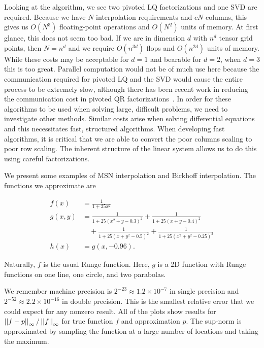 Looking at the algorithm, we see two pivoted LQ factorizations
and one SVD are required.
Because we have $N$ interpolation requirements
and $cN$ columns, this gives us $O(N^{3})$ floating-point operations
and $O(N^{2})$ units of memory.
At first glance, this does not seem too bad.
If we are in dimension $d$ with $n^{d}$ tensor grid points, then $N = n^{d}$ and
we require $O(n^{3d})$ flops and $O(n^{2d})$ units of memory.
While these costs may be acceptable for $d=1$ and bearable for $d=2$,
when $d=3$ this is too great.
Parallel computation would not be
of much use here because the communication required for pivoted LQ
and the SVD would cause the entire process to be extremely slow,
although there has been recent work in reducing the communication cost
in pivoted QR factorizations~\cite{demmel2015communication}.
In order for these algorithms to be used when solving large, difficult
problems, we need to investigate other methods.
Similar costs arise when solving differential equations and
this necessitates fast, structured algorithms.
When developing fast algorithms, it is critical
that we are able to convert the poor columns scaling to poor row scaling.
The inherent structure of the linear system allows us to do this
using careful factorizations.

We present some examples of MSN interpolation and Birkhoff interpolation.
The functions we approximate are

\begin{samepage}
\begin{align}
    f(x) &= \frac{1}{1+25x^{2}} \nonumber\\
    g(x,y) &= \frac{1}{1+ 25(x^2 + y - 0.3)^{2}}
       + \frac{1}{1+ 25(x + y - 0.4)^{2}} \nonumber\\
       &\quad + \frac{1}{1+ 25(x + y^{2} - 0.5)^{2}}
       + \frac{1}{1+ 25(x^{2} + y^{2} - 0.25)^{2}}
        \nonumber\\
    h(x) &= g(x,-0.96).
    \label{eq:intro_runge_functions}
\end{align}
\end{samepage}

\noindent
Naturally, $f$ is the usual Runge function. Here, $g$ is a 2D
function with Runge functions on one line, one circle, and two
parabolas.

We remember machine precision is $2^{-23}\approx 1.2\times10^{-7}$ in single
precision and $2^{-52}\approx 2.2\times10^{-16}$ in double precision.
This is the smallest relative error that we could expect for
any nonzero result. All of the plots show results for
$\left| \left| f-p \right| \right|_{\infty}/\left| \left| f \right| \right|_{\infty}$ for true function $f$
and approximation $p$. The sup-norm is approximated
by sampling the function at a large number of locations and taking
the maximum.

